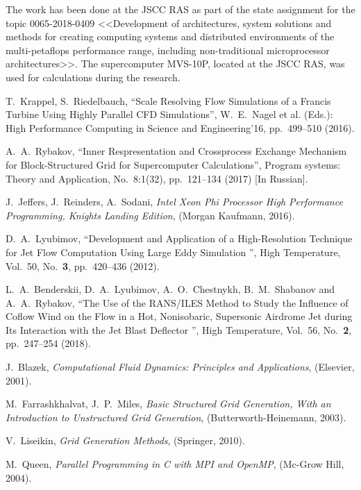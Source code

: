 \documentclass[
11pt,%
tightenlines,%
twoside,%
onecolumn,%
nofloats,%
nobibnotes,%
nofootinbib,%
superscriptaddress,%
noshowpacs,%
centertags]%
{revtex4}
\begin{document}
\begin{acknowledgments}
The work has been done at the JSCC RAS as part of the state assignment for the topic 0065-2018-0409 <<Development of architectures, system solutions and methods for creating computing systems and distributed environments of the multi-petaflops performance range, including non-traditional microprocessor architectures>>. The supercomputer MVS-10P, located at the JSCC RAS, was used for calculations during the research.
\end{acknowledgments}

\begin{thebibliography}{99}

T.~Krappel, S.~Riedelbauch, \textquotedblleft Scale Resolving Flow Simulations of a Francis Turbine Using Highly Parallel CFD Simulations\textquotedblright, W.~E.~Nagel et al. (Eds.): High Performance Computing in Science and Engineering'16, pp.~499--510 (2016).

A.~A.~Rybakov, \textquotedblleft Inner Respresentation and Crossprocess Exchange Mechanism for Block-Structured Grid for Supercomputer Calculations\textquotedblright, Program systems: Theory and Application, No.~8:1(32), pp.~121--134 (2017) [In Russian].

J.~Jeffers, J.~Reinders, A.~Sodani, \emph{Intel Xeon Phi Processor High Performance Programming, Knights Landing Edition}, (Morgan Kaufmann, 2016).

D.~A.~Lyubimov, \textquotedblleft Development and Application of a High-Resolution Technique for Jet Flow Computation Using Large Eddy Simulation \textquotedblright, High Temperature, Vol.~50, No.~\textbf{3}, pp.~420--436 (2012).

L.~A.~Benderskii, D.~A.~Lyubimov, A.~O.~Chestnykh, B.~M.~Shabanov and A.~A.~Rybakov, \textquotedblleft The Use of the RANS/ILES Method to Study the Influence of Coflow Wind on the Flow in a Hot, Nonisobaric, Supersonic Airdrome Jet during Its Interaction with the Jet Blast Deflector \textquotedblright, High Temperature, Vol.~56, No.~\textbf{2}, pp.~247--254 (2018).

J.~Blazek, \emph{Computational Fluid Dynamics: Principles and Applications}, (Elsevier, 2001).

M.~Farrashkhalvat, J.~P.~Miles, \emph{Basic Structured Grid Generation, With an Introduction to Unstructured Grid Generation}, (Butterworth-Heinemann, 2003).

V.~Liseikin, \emph{Grid Generation Methods}, (Springer, 2010).

M.~Queen, \emph{Parallel Programming in C with MPI and OpenMP}, (Mc-Grow Hill, 2004).

\end{thebibliography}
\end{document}
